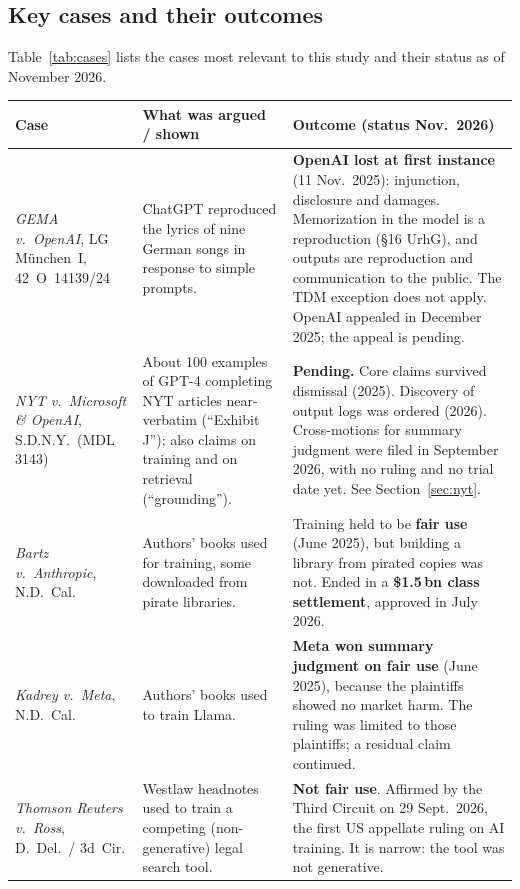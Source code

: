 \documentclass[10pt,a4paper]{article}
\begin{document}
\subsection{Key cases and their outcomes}
Table~\ref{tab:cases} lists the cases most relevant to this study and their status as of November 2026.

\begin{table}[h]\centering\footnotesize
\begin{tabularx}{\linewidth}{>{\raggedright\arraybackslash}p{2.6cm}>{\raggedright\arraybackslash}X>{\raggedright\arraybackslash}X}
\toprule
Case & What was argued / shown & Outcome (status Nov.\ 2026)\\
\midrule
\emph{GEMA v.\ OpenAI}, LG M\"unchen~I, 42~O~14139/24 &
ChatGPT reproduced the lyrics of nine German songs in response to simple prompts. &
\textbf{OpenAI lost at first instance} (11 Nov.\ 2025): injunction, disclosure and damages. Memorization in the model
is a reproduction (\S16 UrhG), and outputs are reproduction and communication to the public. The TDM exception does
not apply. OpenAI appealed in December 2025; the appeal is pending.\\
\emph{NYT v.\ Microsoft \& OpenAI}, S.D.N.Y.\ (MDL 3143) &
About 100 examples of GPT-4 completing NYT articles near-verbatim (``Exhibit J''); also claims on training and on
retrieval (``grounding''). &
\textbf{Pending.} Core claims survived dismissal (2025). Discovery of output logs was ordered (2026). Cross-motions for
summary judgment were filed in September 2026, with no ruling and no trial date yet. See Section~\ref{sec:nyt}.\\
\emph{Bartz v.\ Anthropic}, N.D.~Cal. &
Authors' books used for training, some downloaded from pirate libraries. &
Training held to be \textbf{fair use} (June 2025), but building a library from pirated copies was not. Ended in a
\textbf{\$1.5\,bn class settlement}, approved in July 2026.\\
\emph{Kadrey v.\ Meta}, N.D.~Cal. &
Authors' books used to train Llama. &
\textbf{Meta won summary judgment on fair use} (June 2025), because the plaintiffs showed no market harm. The ruling
was limited to those plaintiffs; a residual claim continued.\\
\emph{Thomson Reuters v.\ Ross}, D.~Del.\ / 3d~Cir. &
Westlaw headnotes used to train a competing (non-generative) legal search tool. &
\textbf{Not fair use}. Affirmed by the Third Circuit on 29 Sept.\ 2026, the first US appellate ruling on AI training.
It is narrow: the tool was not generative.\\

\end{tabularx}
\end{table}
\end{document}
